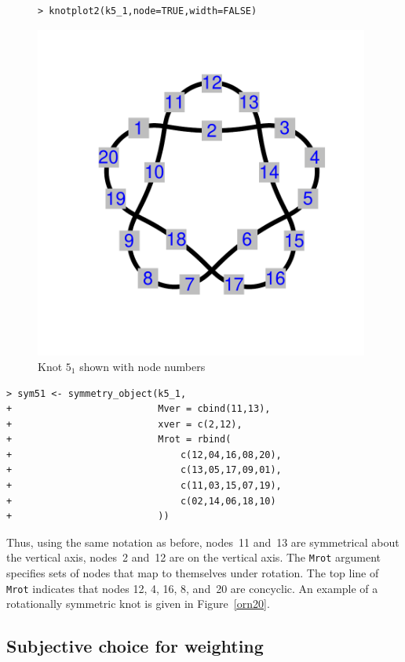 \documentclass{birkjour}
\theoremstyle{definition}
\theoremstyle{remark}
\numberwithin{equation}{section}
\begin{document}
\begin{figure}[htbp]
  \begin{center}
\begin{verbatim}
> knotplot2(k5_1,node=TRUE,width=FALSE)
\end{verbatim}
\includegraphics[width=11cm]{knot-k5_1}
\caption{Knot $5_1$ \label{k5_1_twoknots} shown with node numbers}
  \end{center}
\end{figure}

\begin{verbatim}
> sym51 <- symmetry_object(k5_1,
+                          Mver = cbind(11,13),
+                          xver = c(2,12),
+                          Mrot = rbind(
+                              c(12,04,16,08,20),
+                              c(13,05,17,09,01),
+                              c(11,03,15,07,19),
+                              c(02,14,06,18,10)
+                          ))
\end{verbatim}

Thus, using the same notation as before, nodes~11 and~13 are
symmetrical about the vertical axis, nodes~2 and~12 are on the
vertical axis.  The {\tt Mrot} argument specifies sets of nodes that
map to themselves under rotation.  The top line of {\tt Mrot}
indicates that nodes 12, 4, 16, 8, and~20 are concyclic.  An example
of a rotationally symmetric knot is given in Figure~\ref{orn20}.  

\subsection{Subjective \label{section_cca} choice for weighting}
\end{document}
